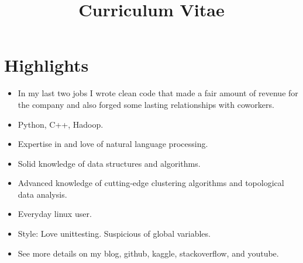 \documentclass[11pt,a4paper,sans]{moderncv} %
\title{Curriculum Vitae}
\begin{document}
\makecvtitle %

\section{Highlights}
\begin{itemize}
\item In my last two jobs I wrote clean code that made a fair amount of revenue for the company and also forged some lasting relationships with coworkers.
\item Python, C++, Hadoop.
\item Expertise in and love of natural language processing.
\item Solid knowledge of data structures and algorithms.
\item Advanced knowledge of cutting-edge clustering algorithms and topological data analysis.
\item Everyday linux user.
\item Style: Love unittesting. Suspicious of global variables.
\item See more details on my blog, github, kaggle, stackoverflow, and youtube.
\end{itemize}
\end{document}
